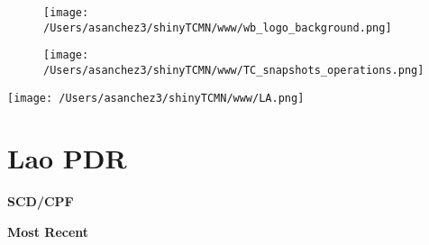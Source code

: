 \documentclass{article}\usepackage[]{graphicx}\usepackage[]{color}
\begin{document}
\newpage
\begin{figure}
  \vspace{-3ex} %
  \hspace{-7ex} %
  \texttt{[image: /Users/asanchez3/shinyTCMN/www/wb\_logo\_background.png]}
\end{figure}
\begin{figure}
  \begin{minipage}[t]{0.99\textwidth} %
      \vspace{-30ex}
      \hspace{-2ex}
      \raggedright{\texttt{[image: /Users/asanchez3/shinyTCMN/www/TC\_snapshots\_operations.png]}}
  \end{minipage}
\end{figure}
%
\begin{minipage}[t]{0.99\textwidth} %
  \vspace{-1.5cm}
  \begin{minipage}[c]{0.36\textwidth} 
    \begin{minipage}[c]{0.28\textwidth} %
      \texttt{[image: /Users/asanchez3/shinyTCMN/www/LA.png]}
    \end{minipage}
    \begin{minipage}[c]{0.70\textwidth} %
      \section*{\color{blue!40!black}Lao PDR}
    \end{minipage}
  \end{minipage}
  \begin{minipage}[c]{0.63\textwidth}
  \end{minipage}  
\end{minipage} %

  \raggedright{\color{white!30!blue} \textbf{\Large SCD/CPF}}
    \begin{minipage}[c]{0.99\textwidth}  
      \vspace*{0.2cm}
      \raggedright{\color{white!30!blue} \textbf{\large Most Recent}}
      \vspace*{0.3cm}
      

      \vspace*{0.5cm}
    \end{minipage}
    
\end{document}
